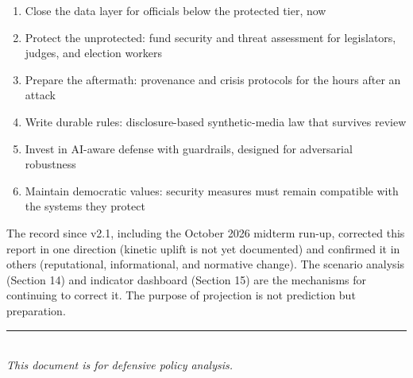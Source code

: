 \documentclass[11pt,letterpaper]{article}
\makeatletter
\newcommand{\etraneed}[1]{\par\if@nobreak\else\penalty\z@\ifdim\pagegoal<\maxdimen\ifdim\dimexpr\pagegoal-\pagetotal\relax<\dimexpr#1\relax\newpage\fi\fi\fi}
\makeatother
\begin{document}
\etraneed{13\baselineskip}
\begin{recbox}
\begin{enumerate}
  \item Close the data layer for officials below the protected tier, now
  \item Protect the unprotected: fund security and threat assessment for legislators, judges, and election workers
  \item Prepare the aftermath: provenance and crisis protocols for the hours after an attack
  \item Write durable rules: disclosure-based synthetic-media law that survives review
  \item Invest in AI-aware defense with guardrails, designed for adversarial robustness
  \item Maintain democratic values: security measures must remain compatible with the systems they protect
\end{enumerate}
\end{recbox}

The record since v2.1, including the October 2026 midterm run-up, corrected this report in one direction (kinetic uplift is not yet documented) and confirmed it in others (reputational, informational, and normative change). The scenario analysis (Section 14) and indicator dashboard (Section 15) are the mechanisms for continuing to correct it. The purpose of projection is not prediction but preparation.

\vspace{0.5cm}
\begin{center}
\textcolor{coolgray}{\rule{6cm}{0.5pt}}\\[0.5cm]
\textit{This document is for defensive policy analysis.}
\end{center}

\appendix
\end{document}
